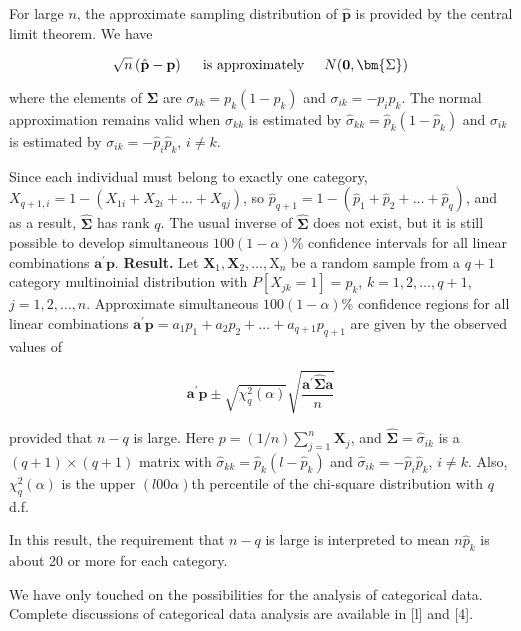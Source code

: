For large $n$, the approximate sampling distribution of $\hat{\textbf{p}}$ is provided by the central limit theorem. We have

\[
    \sqrt{n} \left(\hat{\textbf{p}} - \textbf{p}\right)
    \hspace{0.5cm}
    \text{is approximately}
    \hspace{0.5cm}
    N (\textbf{0}, \bm{\Sigma})
\]

where the elements of $\bm{\Sigma}$ are $\sigma_{kk} = p_{k}( 1 - p_{k})$ and $\sigma_{ik} = -p_{i}p_{k}$. The normal approximation
remains valid when $\sigma_{kk}$ is estimated by $\hat{\sigma}_{kk} = \hat{p}_{k}(1 - \hat{p}_{k})$ and $\sigma_{ik}$ is estimated
by $\sigma_{ik} = -\hat{p}_{i}\hat{p}_{k}$, $i \ne k$.
\par
Since each individual must belong to exactly one category, $X_{q+1,i} =
1 - (X_{1i} + X_{2i} + \dots + X_{qj})$, so $\hat{p}_{q+1} = 1 - (\hat{p}_{1} + \hat{p}_{2} + \dots + \hat{p}_{q})$, and as a result, $\hat{\bm{\Sigma}}$
has rank $q$.
The usual inverse of $\hat{\bm{\Sigma}}$ does not exist, but it is still possible to develop simultaneous
$100(1 - \alpha)$\% confidence intervals for all linear combinations $\textbf{a}^{\prime}\textbf{p}$.
\newline
\newline
\textbf{Result.} Let $\textbf{X}_{1} , \textbf{X}_{2} , \dots, \text{X}_{n}$ be a random sample from a $q + 1$ category multinoinial
distribution with $P[X_{jk} = 1] = p_{k}$, $k = 1, 2, \dots, q + 1$, $j = 1, 2, \dots, n$.
Approximate
simultaneous $100(1 - \alpha)$\% confidence regions for all linear combinations $\textbf{a}^{\prime}\textbf{p} = a_{1}p_{1} + a_{2}p_{2} + \dots + a_{q+1}p_{q+1}$ are given by the observed values of

\[
    \textbf{a}^{\prime}\textbf{p}
    \pm
    \sqrt{\chi^{2}_{q}(\alpha)}
    \sqrt{\frac{\textbf{a}^{\prime}\hat{\bm{\Sigma}}\textbf{a}}{n}}
\]

provided that $n-q$ is large. Here $p = (1/n) \sum_{j=1}^{n}{\textbf{X}_{j}}$, and $\hat{\bm{\Sigma}} = {\hat{\sigma}_{ik}}$ is a $(q + 1) \times (q + 1)$
matrix with $\hat{\sigma}_{kk} = \hat{p}_{k}(l - \hat{p}_{k})$ and $\hat{\sigma}_{ik} = -\hat{p}_{i}\hat{p}_{k}$, $i \ne k$. Also, $\chi^{2}_{q}(\alpha)$ is the upper
$(l00\alpha)$th percentile of the chi-square distribution with $q$ d.f.
\newline
\newline
\par
In this result, the requirement that $n - q$ is large is interpreted to mean $n\hat{p}_{k}$ is about 20 or more for each category.
\par
We have only touched on the possibilities for the analysis of categorical data. Complete discussions of categorical data analysis are available in [l] and [4].